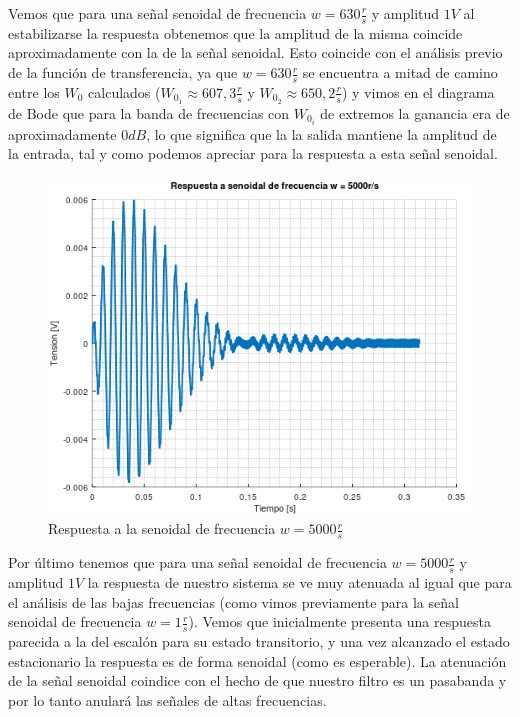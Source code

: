 \documentclass[11pt,a4paper]{report}
\begin{document}
Vemos que para una señal senoidal de frecuencia $w = 630\frac{r}{s}$ y amplitud
$1V$ al estabilizarse la respuesta obtenemos que la amplitud de la misma coincide aproximadamente con la de la señal senoidal. Esto coincide con el análisis
previo de la función de transferencia, ya que $w = 630\frac{r}{s}$ se encuentra a mitad de camino entre los $W_{0}$ calculados ($W_{0_{1}} \approx 607,3 \frac{r}{s}$ y 
$W_{0_{2}} \approx 650,2 \frac{r}{s}$) y vimos en el diagrama de Bode que para la banda de frecuencias con $W_{0_{i}}$ de extremos la ganancia era de aproximadamente $0dB$, lo que significa que la la salida mantiene la amplitud de la entrada, tal y como podemos apreciar para la respuesta a esta señal senoidal.

\newpage
\begin{figure}[h!]
\includegraphics[scale=0.98]{RtaSenoidalAlto.png}
\caption{Respuesta a la senoidal de frecuencia $w = 5000\frac{r}{s}$}
\end{figure}

Por último tenemos que para una señal senoidal de frecuencia $w = 5000\frac{r}{s}$ y amplitud $1V$ la respuesta de nuestro sistema se ve muy atenuada al igual que para
el análisis de las bajas frecuencias (como vimos previamente para la señal senoidal de frecuencia $w = 1\frac{r}{s}$). Vemos que inicialmente presenta una respuesta parecida a la del escalón para su estado transitorio, y una vez alcanzado el estado
estacionario la respuesta es de forma senoidal (como es esperable). La atenuación de la señal senoidal coindice con el hecho de que nuestro filtro es un pasabanda y
por lo tanto anulará las señales de altas frecuencias.
\end{document}
